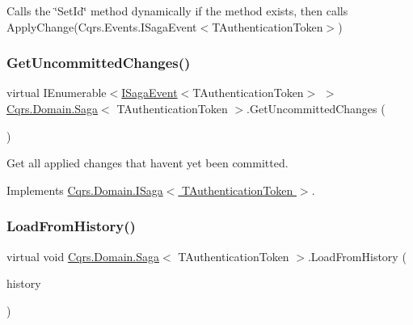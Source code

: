 Calls the \char`\"{}\+Set\+Id\char`\"{} method dynamically if the method exists, then calls Apply\+Change(\+Cqrs.\+Events.\+I\+Saga\+Event$<$\+T\+Authentication\+Token$>$) 

\mbox{\label{classCqrs_1_1Domain_1_1Saga_a759b30b518c7fa5037ec4041054f349c_a759b30b518c7fa5037ec4041054f349c}} 
\subsubsection{\texorpdfstring{Get\+Uncommitted\+Changes()}{GetUncommittedChanges()}}
{\footnotesize\ttfamily virtual I\+Enumerable$<$\hyperlink{interfaceCqrs_1_1Events_1_1ISagaEvent}{I\+Saga\+Event}$<$T\+Authentication\+Token$>$ $>$ \hyperlink{classCqrs_1_1Domain_1_1Saga}{Cqrs.\+Domain.\+Saga}$<$ T\+Authentication\+Token $>$.Get\+Uncommitted\+Changes (\begin{DoxyParamCaption}{ }\end{DoxyParamCaption})\hspace{0.3cm}{\ttfamily [virtual]}}



Get all applied changes that haven\textquotesingle{}t yet been committed. 



Implements \hyperlink{interfaceCqrs_1_1Domain_1_1ISaga_abb77811b4f7d19adb61f9d33da18e7e0_abb77811b4f7d19adb61f9d33da18e7e0}{Cqrs.\+Domain.\+I\+Saga$<$ T\+Authentication\+Token $>$}.

\mbox{\label{classCqrs_1_1Domain_1_1Saga_a6029fc09445e2093f7fb40e304a04ff8_a6029fc09445e2093f7fb40e304a04ff8}} 
\subsubsection{\texorpdfstring{Load\+From\+History()}{LoadFromHistory()}}
{\footnotesize\ttfamily virtual void \hyperlink{classCqrs_1_1Domain_1_1Saga}{Cqrs.\+Domain.\+Saga}$<$ T\+Authentication\+Token $>$.Load\+From\+History (\begin{DoxyParamCaption}\item[{I\+Enumerable$<$ \hyperlink{interfaceCqrs_1_1Events_1_1ISagaEvent}{I\+Saga\+Event}$<$ T\+Authentication\+Token $>$$>$}]{history }\end{DoxyParamCaption})\hspace{0.3cm}{\ttfamily [virtual]}}



